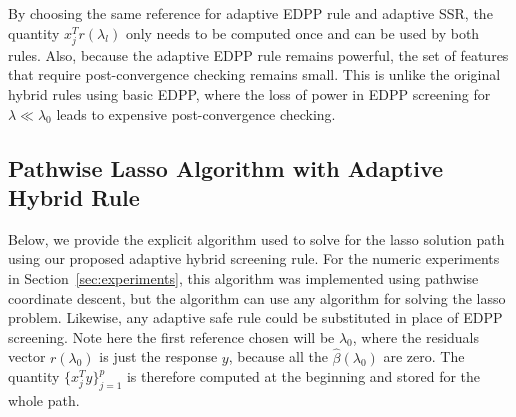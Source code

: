 \documentclass[]{interact}
\theoremstyle{plain}%
\theoremstyle{definition}
\theoremstyle{remark}
\begin{document}
By choosing the same reference for adaptive EDPP rule and adaptive SSR, the quantity $x_j^Tr(\lambda_l)$ only needs to be computed once and can be used by both rules. Also, because the adaptive EDPP rule remains powerful, the set of features that require post-convergence checking remains small.  This is unlike the original hybrid rules using basic EDPP, where the loss of power in EDPP screening for $\lambda \ll \lambda_0$ leads to expensive post-convergence checking.

\subsection{Pathwise Lasso Algorithm with Adaptive Hybrid Rule}

Below, we provide the explicit algorithm used to solve for the lasso solution path using our proposed adaptive hybrid screening rule. For the numeric experiments in Section~\ref{sec:experiments}, this algorithm was implemented using pathwise coordinate descent, but the algorithm can use any algorithm for solving the lasso problem.  Likewise, any adaptive safe rule could be substituted in place of EDPP screening.  Note here the first reference chosen will be $\lambda_0$, where the residuals vector $r(\lambda_0)$ is just the response $y$, because all the $\hat{\beta}(\lambda_0)$ are zero. The quantity $\{x_j^Ty\}_{j=1}^p$ is therefore computed at the beginning and stored for the whole path.
\end{document}
